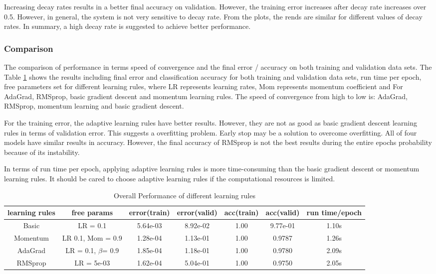 \documentclass[11pt]{article}
\begin{document}
Increasing decay rates results in a better final accuracy on validation. However, the training error increases after decay rate increases over 0.5. However, in general, the system is not very sensitive to decay rate. From the plots, the rends are similar for different values of decay rates. In summary, a high decay rate is suggested to achieve better performance. 

\subsubsection{Comparison}
The comparison of performance in terms speed of convergence and the final error / accuracy on both training and validation data sets. The Table \ref{tb:final_P} shows the results including final error and classification accuracy for both training and validation data sets, run time per epoch, free parameters set for different learning rules, where LR represents learning rates, Mom represents momentum coefficient and 
For AdaGrad, RMSprop, basic gradient descent and momentum learning rules. The speed of convergence from high to low is: AdaGrad, RMSprop, momentum learning and basic gradient descent. 

For the training error, the adaptive learning rules have better results. However, they are not as good as basic gradient descent learning rules in terms of validation error. This suggests a overfitting problem. Early stop may be a solution to overcome overfitting.
All of four models have similar results in accuracy. However, the final accuracy of RMSprop is not the best results during the entire epochs probability because of its instability.

In terms of run time per epoch, applying adaptive learning rules is more time-consuming than the basic gradient descent or momentum learning rules. It should be cared to choose adaptive learning rules if the computational resources is limited. 



\begin{table}
\begin{center}
\begin{tabular}{ c c c c c c c} 
\hline
learning rules & free params & error(train) & error(valid) & acc(train) & acc(valid) & run time/epoch\\
\hline
\hline
Basic 		&  LR =	0.1				&  5.64e-03 & 8.92e-02 & 1.00 & 9.77e-01 & 1.10s\\ 
Momentum 	& LR 0.1, Mom = 0.9		&  1.28e-04 & 1.13e-01 & 1.00 & 0.9787 & 1.26s\\
AdaGrad		& LR = 0.1,	$\beta$= 0.9&1.85e-04 	& 1.18e-01 & 1.00 & 0.9780 &  2.09s\\ 
RMSprop 	& LR = 5e-03 			& 1.62e-04  & 5.04e-01 & 1.00 & 0.9750 & 2.05s\\
\end{tabular}
\caption{Overall Performance of different learning rules}
\label{tb:final_P}
\end{center}	
\end{table}
\end{document}
